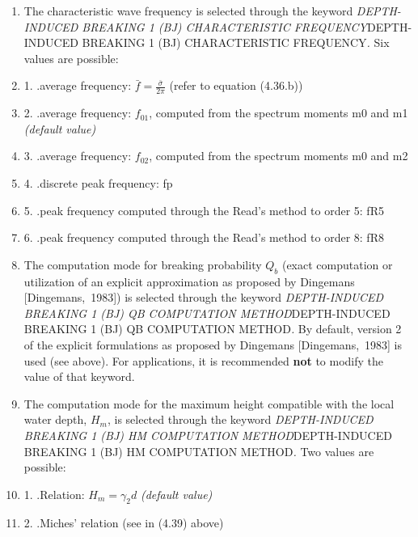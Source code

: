  \begin{enumerate}
\item The characteristic wave frequency is selected through the keyword \textit{DEPTH-INDUCED BREAKING 1 (BJ) CHARACTERISTIC FREQUENCY}DEPTH-INDUCED BREAKING 1 (BJ) CHARACTERISTIC FREQUENCY\textit{. }Six values are possible:\textit{}

 \item 1. .average frequency: $\bar{f}=\frac{\bar{\sigma }}{2\pi } $  (refer to equation (4.36.b))

 \item 2. .average frequency: $f_{01} $, computed from the spectrum moments m0 and m1 \textit{(default value)}

 \item 3. .average frequency: $f_{02} $, computed from the spectrum moments m0 and m2

 \item 4. .discrete peak frequency: fp

 \item 5. .peak frequency computed through the Read's method to order 5: fR5

 \item 6. .peak frequency computed through the Read's method to order 8: fR8

 \item The computation mode for breaking probability $Q_{b} $ (exact computation or utilization of an explicit approximation as proposed by Dingemans [Dingemans,~1983]) is selected through the keyword \textit{DEPTH-INDUCED BREAKING 1 (BJ) QB COMPUTATION METHOD}DEPTH-INDUCED BREAKING 1 (BJ) QB COMPUTATION METHOD\textit{.} By default,\textit{ }version 2 of the explicit formulations as proposed by Dingemans [Dingemans,~1983] is used (see above). For applications, it is recommended \textbf{not} to modify the value of that keyword.

 \item The computation mode for the maximum height compatible with the local water depth, $H_{m} $, is selected through the keyword \textit{DEPTH-INDUCED BREAKING 1 (BJ) HM COMPUTATION METHOD}DEPTH-INDUCED BREAKING 1 (BJ) HM COMPUTATION METHOD\textit{. }Two values are possible:\textit{}

 \item 1. .Relation: $H_{m} =\gamma _{2} d$  \textit{(default value)}

 \item 2. .Miches' relation (see in (4.39) above)
\end{enumerate}


